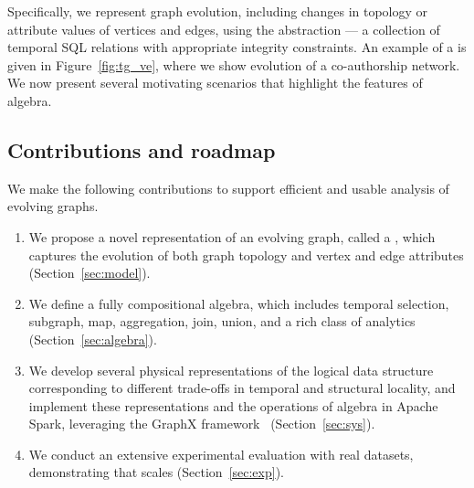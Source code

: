Specifically, we represent graph evolution, including changes in
topology or attribute values of vertices and edges, using the \tg
abstraction --- a collection of temporal SQL relations with
appropriate integrity constraints.  An example of a \tg is given in
Figure~\ref{fig:tg_ve}, where we show evolution of a co-authorship
network.  We now present several motivating scenarios that highlight
the features of \ql algebra.





\subsection{Contributions and roadmap}


We make the following contributions to support efficient and usable
analysis of evolving graphs.

\begin{enumerate}[noitemsep,leftmargin=*]

\item We propose a novel representation of an evolving graph, called a \tg,
  which captures the evolution of both graph topology and vertex and edge attributes (Section~\ref{sec:model}).  

\item We define a fully compositional \tg algebra, which includes
  temporal selection, subgraph, map, aggregation, join, union, and a
  rich class of analytics (Section~\ref{sec:algebra}).

\item We develop several physical representations of the logical \tg
  data structure corresponding to different trade-offs in temporal and
  structural locality, and implement these representations and the operations of \tg algebra in Apache Spark,
  leveraging the GraphX
  framework~\cite{DBLP:conf/osdi/GonzalezXDCFS14} 
  (Section~\ref{sec:sys}).  

\item We conduct an extensive experimental evaluation with real
  datasets, demonstrating that \ql scales
  (Section~\ref{sec:exp}).

\end{enumerate}


